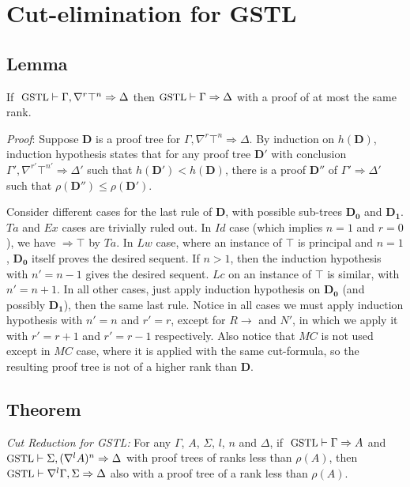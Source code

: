 \section{Cut-elimination for GSTL}

\subsection{Lemma}\label{true-assum} If $~\small\text{GSTL} \vdash \Gamma , \nabla^r \top^n \Rightarrow \Delta$ then $\small\text{GSTL} \vdash \Gamma \Rightarrow \Delta$ with a proof of at most the same rank.

\textit{Proof}: Suppose $\mathbf{D}$ is a proof tree for $\Gamma , \nabla^r \top^n \Rightarrow \Delta$. By induction on $h(\mathbf{D})$, induction hypothesis states that for any proof tree $\mathbf{D}'$ with conclusion $\Gamma' , \nabla^{r'} \top^{n'} \Rightarrow \Delta'$ such that $h(\mathbf{D}') < h(\mathbf{D})$, there is a proof $\mathbf{D}''$ of $\Gamma' \Rightarrow \Delta'$ such that $\rho(\mathbf{D}'') \leq \rho(\mathbf{D}')$.

Consider different cases for the last rule of $\mathbf{D}$, with possible sub-trees $\mathbf{D_0}$ and $\mathbf{D_1}$. $Ta$ and $Ex$ cases are trivially ruled out. In $Id$ case (which implies $n = 1$ and $r = 0$), we have $\Rightarrow \top$ by $Ta$. In $Lw$ case, where an instance of $\top$ is principal and $n = 1$, $\mathbf{D_0}$ itself proves the desired sequent. If $n > 1$, then the induction hypothesis with $n' = n - 1$ gives the desired sequent. $Lc$ on an instance of $\top$ is similar, with $n' = n + 1$. In all other cases, just apply induction hypothesis on $\mathbf{D_0}$ (and possibly $\mathbf{D_1}$), then the same last rule. Notice in all cases we must apply induction hypothesis with $n' = n$ and $r' = r$, except for $R\rightarrow$ and $N'$, in which we apply it with $r' = r + 1$ and $r' = r - 1$ respectively. Also notice that $MC$ is not used except in $MC$ case, where it is applied with the same cut-formula, so the resulting proof tree is not of a higher rank than $\mathbf{D}$.

\subsection{Theorem}\label{cut-admis} \emph{Cut Reduction for GSTL: } For any $\Gamma$, $A$, $\Sigma$, $l$, $n$ and $\Delta$, if $~\small\text{GSTL} \vdash \Gamma \Rightarrow A$ and $\small\text{GSTL} \vdash \Sigma , (\nabla^l A)^n \Rightarrow \Delta$ with proof trees of ranks less than $\rho(A)$, then
 $\small\text{GSTL} \vdash \nabla^l \Gamma , \Sigma \Rightarrow \Delta$ also with a proof tree of a rank less than $\rho(A)$.
 
